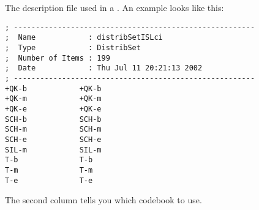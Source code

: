 
\section{}

The description file used in a . An example
looks like this:

\begin{verbatim}
; -------------------------------------------------------
;  Name            : distribSetISLci
;  Type            : DistribSet
;  Number of Items : 199
;  Date            : Thu Jul 11 20:21:13 2002
; -------------------------------------------------------
+QK-b            +QK-b
+QK-m            +QK-m
+QK-e            +QK-e
SCH-b            SCH-b
SCH-m            SCH-m
SCH-e            SCH-e
SIL-m            SIL-m
T-b              T-b
T-m              T-m
T-e              T-e
\end{verbatim}

The second column tells you which codebook to use.

